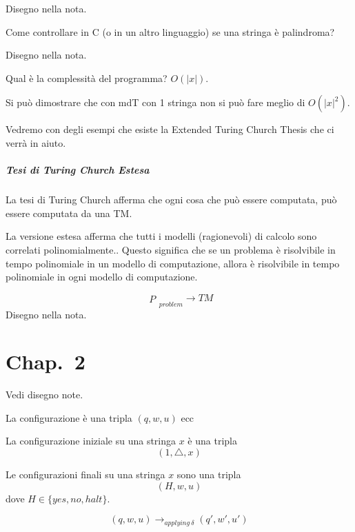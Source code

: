 Disegno nella nota.

Come controllare in C (o in un altro linguaggio) se una stringa è palindroma?

Disegno nella nota.

Qual è la complessità del programma? $O(|x|)$.

Si può dimostrare che con mdT con 1 stringa non si può fare meglio di $O(|x|^2)$.

Vedremo con degli esempi che esiste la Extended Turing Church Thesis che ci verrà in aiuto.


\paragraph{Tesi di Turing Church Estesa} La tesi di Turing Church afferma che ogni cosa che può essere computata, può essere computata da una TM.

La versione estesa afferma che tutti i modelli (ragionevoli) di calcolo sono correlati polinomialmente.. Questo significa che se un problema è risolvibile in tempo polinomiale in un modello di computazione, allora è risolvibile in tempo polinomiale in ogni modello di computazione.

$$
    \substack{P}_{problem} \to TM 
$$
Disegno nella nota.


\chapter{Chap.~2}

\begin{definition}[Configurazione]
    Vedi disegno note.

    La configurazione è una tripla $(q,w,u)$ ecc
\end{definition}


\begin{definition}
    La configurazione iniziale su una stringa $x$ è una tripla 
    $$
    (1,\triangle,x)
    $$
\end{definition}

\begin{definition}
    Le configurazioni finali su una stringa $x$ sono una tripla 
    $$
    (H,w,u)
    $$
    dove $H\in\{yes,no,halt\}$.
\end{definition}


\begin{definition}
    $$
        (q,w,u) \to_{applying~\delta} (q',w',u') 
    $$
\end{definition}


